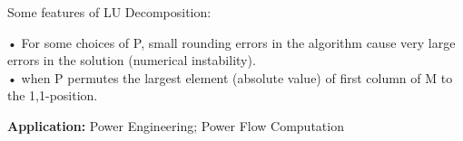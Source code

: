 \documentclass[]{finalproject}
\begin{document}
\begin{flushleft}
Some features of LU Decomposition:
\begin{flushleft}
• For some choices of P, small rounding errors in the algorithm cause very
large errors in the solution (numerical instability).\\
• when P permutes the largest element (absolute value) of first column of M to the 1,1-position.
\end{flushleft}


\textbf{Application:} Power Engineering; Power Flow Computation \cite{lu_application} \newline

\end{flushleft}
\
\end{document}
